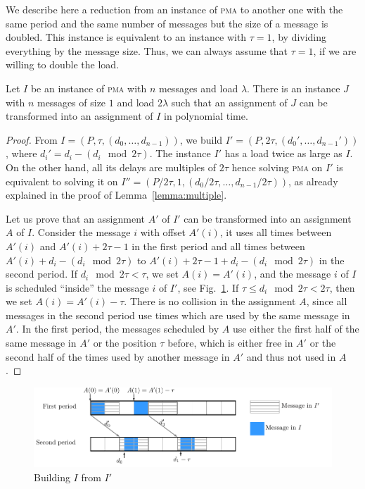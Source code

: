 \documentclass[a4paper,UKenglish,cleveref, autoref, thm-restate]{lipics-v2019}
\newcommand\pma{\textsc{pma}\xspace}
\begin{document}
We describe here a reduction from an instance of \pma to another one with the same period and the same number of messages but the size of a message is doubled. This instance is equivalent to an instance with $\tau = 1$, by dividing everything by the message size. Thus, we can always assume that $\tau = 1$, if we are willing to double the load.


\begin{theorem}\label{th:double_load}
Let $I$ be an instance of \pma with $n$ messages and load $\lambda$. There is an instance $J$ with $n$ messages of size $1$
and load $2\lambda$ such that an assignment of $J$ can be transformed into an assignment of $I$ in polynomial time.
\end{theorem}
\begin{proof}
From $I = (P,\tau,(d_{0},\dots,d_{n-1}))$, we build $I' = (P, 2\tau, (d_{0}',\dots,d_{n-1}'))$, where $d_i' = d_{i} - (d_{i} \mod 2\tau)$. The instance $I'$ has a load twice as large as $I$.
On the other hand, all its delays are multiples of $2\tau$ hence solving \pma on $I'$ is equivalent to solving it on $I'' = (P/2\tau, 1,(d_{0}/ 2\tau,\dots,d_{n-1} /2\tau))$, as already explained in the proof of Lemma~\ref{lemma:multiple}. 

Let us prove that an assignment $A'$ of $I'$ can be transformed into an assignment $A$ of $I$. 
Consider the message $i$ with offset $A'(i)$, it uses all times between $A'(i)$ and $A'(i) + 2\tau -1$ in the first period and all times between $A'(i) + d_{i} - (d_{i} \mod 2\tau)$ to $A'(i) + 2\tau -1+ d_{i} - (d_{i} \mod 2\tau)$ in the second period. 
If $d_{i} \mod 2\tau < \tau $, we set $A(i) = A'(i)$, and the message $i$ of $I$ is scheduled ``inside'' the 
message $i$ of $I'$, see Fig.~\ref{fig:transf_2tau}. If $\tau \leq d_{i} \mod 2\tau < 2\tau$, then we set 
$A(i) = A'(i) - \tau$. There is no collision in the assignment $A$, since all messages in the second period use
times which are used by the same message in $A'$. In the first period, the messages scheduled by $A$ use either the first
half of the same message in $A'$ or the position $\tau$ before, which is either free in $A'$ or the second half of the times used by another message in $A'$ and thus not used in $A$. 
\end{proof}
\begin{figure}[h]
\begin{center}

\includegraphics[scale=0.7]{transfo2tau}
\end{center}
\caption{Building $I$ from $I'$}
\label{fig:transf_2tau}
\end{figure}
\end{document}
